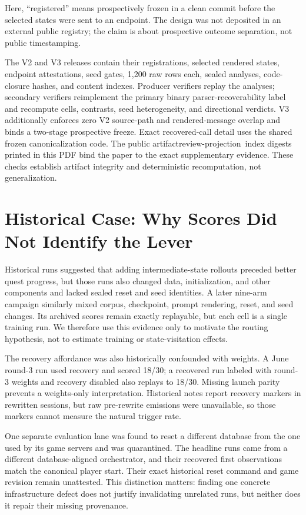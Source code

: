 \documentclass[10pt]{article}
\begin{document}
Here, ``registered'' means prospectively frozen in a clean commit before the
selected states were sent to an endpoint. The design was not deposited in an
external public registry; the claim is about prospective outcome separation,
not public timestamping.

The V2 and V3 releases contain their registrations, selected rendered states,
endpoint attestations, seed gates, 1,200 raw rows each, sealed analyses,
code-closure hashes, and content indexes. Producer verifiers replay the
analyses; secondary verifiers reimplement the primary binary
parser-recoverability label and recompute cells, contrasts, seed heterogeneity,
and directional verdicts. V3 additionally enforces zero V2 source-path and
rendered-message overlap and binds a two-stage prospective freeze. Exact
recovered-call detail uses the shared frozen canonicalization code. The
\ifdefined\ARXIVVERSION public artifact\else review-projection\fi\ index
digests printed in this PDF bind the paper to the exact supplementary evidence.
These checks establish artifact integrity and
deterministic recomputation, not generalization.

\section{Historical Case: Why Scores Did Not Identify the Lever}

Historical runs suggested that adding intermediate-state rollouts preceded
better quest progress, but those runs also changed data, initialization, and
other components and lacked sealed reset and seed identities. A later nine-arm
campaign similarly mixed corpus, checkpoint, prompt rendering, reset, and seed
changes. Its archived scores remain exactly replayable, but each cell is a
single training run. We therefore use this evidence only to motivate the
routing hypothesis, not to estimate training or state-visitation effects.

The recovery affordance was also historically confounded with weights. A June
round-3 run used recovery and scored 18/30; a recovered run labeled with
round-3 weights and recovery disabled also replays to 18/30. Missing launch
parity prevents a weights-only interpretation. Historical notes report recovery
markers in rewritten sessions, but raw pre-rewrite emissions were unavailable,
so those markers cannot measure the natural trigger rate.

One separate evaluation lane was found to reset a different database from the
one used by its game servers and was quarantined. The headline runs came from a
different database-aligned orchestrator, and their recovered first observations
match the canonical player start. Their exact historical reset command and game
revision remain unattested. This distinction matters: finding one concrete
infrastructure defect does not justify invalidating unrelated runs, but neither
does it repair their missing provenance.
\end{document}
